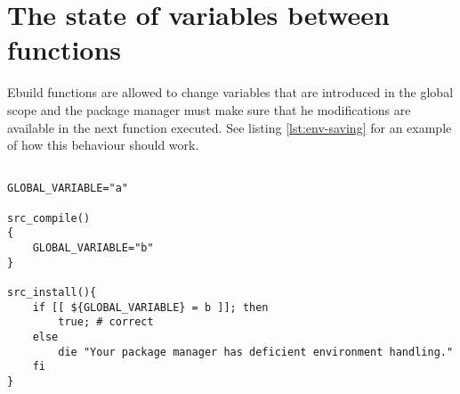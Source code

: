 \section{The state of variables between functions}
\label{ebuild-env-state}

Ebuild functions are allowed to change variables that are introduced in the global scope
and the package manager must make sure that he modifications are available in the next
function executed. See listing \ref{lst:env-saving} for an example of how this behaviour should
work.

\begin{lstlisting}[float,caption=Environment state between functions,label=lst:env-saving]

GLOBAL_VARIABLE="a"

src_compile()
{
    GLOBAL_VARIABLE="b"
}

src_install(){
    if [[ ${GLOBAL_VARIABLE} = b ]]; then
        true; # correct
    else
        die "Your package manager has deficient environment handling."
    fi
}
\end{lstlisting}

